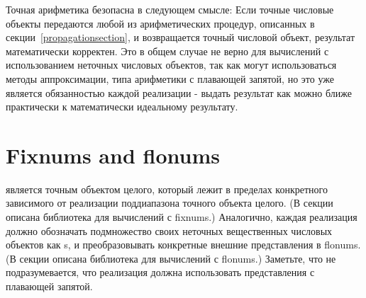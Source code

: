 Точная арифметика безопасна в следующем смысле: Если точные числовые объекты передаются любой из
арифметических процедур, описанных в секции~\ref{propagationsection}, и возвращается точный
числовой объект, результат математически корректен. Это в общем случае не верно для вычислений с
использованием неточных числовых объектов, так как могут использоваться методы аппроксимации,
типа арифметики с плавающей запятой, но это уже является обязанностью каждой реализации -
выдать результат как можно ближе практически к математически идеальному результату.

\section{Fixnums and flonums}

 является точным объектом целого, который лежит в пределах конкретного
зависимого от реализации поддиапазона точного объекта целого. (В секции
 описана библиотека для вычислений с fixnums.) Аналогично,
каждая реализация должно обозначать подмножество своих неточных вещественных числовых объектов
как s, и преобразовывать конкретные внешние представления в flonums. (В секции
 описана библиотека для вычислений с flonums.) Заметьте, что
не подразумевается, что реализация должна использовать представления с плавающей запятой.

